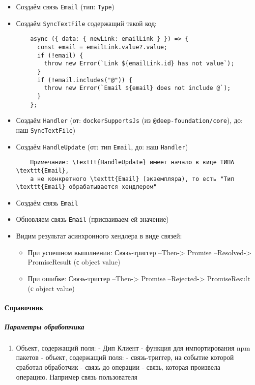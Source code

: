 \documentclass{article}
\begin{document}
\begin{itemize}
  \item Создаём связь \texttt{Email} (тип: \texttt{Type}) 
  \item Создаём \texttt{SyncTextFile} содержащий такой код:
    \begin{verbatim}
    async ({ data: { newLink: emailLink } }) => {
      const email = emailLink.value?.value;
      if (!email) {
        throw new Error(`Link ${emailLink.id} has not value`);
      }
      if (!email.includes("@")) {
        throw new Error(`Email ${email} does not include @`);
      }
    };
    \end{verbatim}
  \item Создаём \texttt{Handler} (от: \texttt{dockerSupportsJs} (из \texttt{@deep-foundation/core}), до: наш \texttt{SyncTextFile})
  \item Создаём \texttt{HandleUpdate} (от: тип \texttt{Email}, до: наш \texttt{Handler})
    \begin{verbatim}
    Примечание: \texttt{HandleUpdate} имеет начало в виде ТИПА \texttt{Email},
    а не конкретного \texttt{Email} (экземпляра), то есть "Тип \texttt{Email} обрабатывается хендлером"
    \end{verbatim}
  \item Создаём связь \texttt{Email}
  \item Обновляем связь \texttt{Email} (присваиваем ей значение)
  \item Видим результат асинхронного хендлера в виде связей:
    \begin{itemize}
      \item При успешном выполнении: Связь-триггер --Then-> Promise --Resolved-> PromiseResult (с object value)
      \item При ошибке: Связь-триггер --Then-> Promise --Rejected-> PromiseResult (с object value)
    \end{itemize}
\end{itemize}

\paragraph{Справочник}
\subparagraph{Параметры обработчика}
\begin{enumerate}
    \item Объект, содержащий поля:
         - Дип Клиент
         - функция для импортирования npm пакетов
         - объект, содержащий поля:
             - связь-триггер, на событие которой сработал обработчик
             - связь до операции
             - связь, которая произвела операцию. Например связь пользователя
\end{enumerate}
\end{document}
